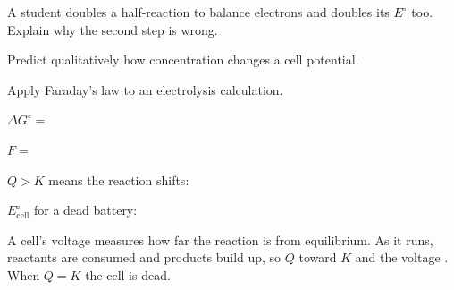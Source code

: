 \documentclass{apchem-notes}
\begin{document}
\begin{exitticket}
A student doubles a half-reaction to balance electrons and doubles its
$E^\circ$ too. Explain why the second step is wrong.
\end{exitticket}


\begin{objectives}
  \item Predict qualitatively how concentration changes a cell potential.
  \item Apply Faraday's law to an electrolysis calculation.
\end{objectives}


\begin{warmup}[4]
  \item $\Delta G^\circ = $ 
  \item $F = $ 
  \item $Q > K$ means the reaction shifts:
  \item $E^\circ_{\text{cell}}$ for a dead battery:
\end{warmup}



A cell's voltage measures how far the reaction is from equilibrium. As it
runs, reactants are consumed and products build up, so $Q$
 toward $K$ and the voltage
. When $Q = K$ the cell is dead.
\end{document}
